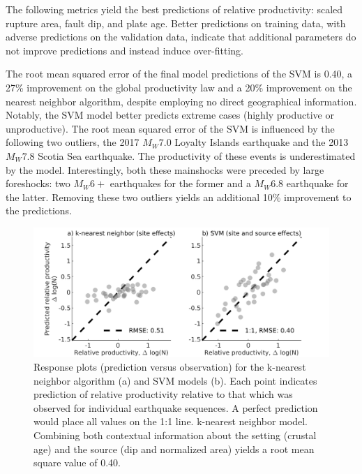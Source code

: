 \documentclass[draft, jgrga]{agujournal2018}
\begin{document}
    The following metrics yield the best predictions of relative productivity: scaled rupture area, fault dip, and plate age. Better predictions on training data, with adverse predictions on the validation data, indicate that additional parameters do not improve predictions and instead induce over-fitting.
    
    The root mean squared error of the final model predictions of the SVM is 0.40, a 27\% improvement on the global productivity law and a 20\% improvement on the nearest neighbor algorithm, despite employing no direct geographical information. Notably, the SVM model better predicts extreme cases (highly productive or unproductive). The root mean squared error of the SVM is influenced by the following two outliers, the 2017 $M_W7.0$ Loyalty Islands earthquake and the 2013 $M_W7.8$ Scotia Sea earthquake. The productivity of these events is underestimated by the model. Interestingly, both these mainshocks were preceded by large foreshocks: two $M_W6+$ earthquakes for the former and a $M_W6.8$ earthquake for the latter. Removing these two outliers yields an additional 10\% improvement to the predictions.
    
    \begin{figure}
        \centering
        \includegraphics{figures/response.png}
        \caption{Response plots (prediction versus observation) for the k-nearest neighbor algorithm (a) and SVM models (b). Each point indicates prediction of relative productivity relative to that which was observed for individual earthquake sequences. A perfect prediction would place all values on the 1:1 line.  k-nearest neighbor model. Combining both contextual information about the setting (crustal age) and the source (dip and normalized area) yields a root mean square value of 0.40.}
        \label{fig:response}
    \end{figure}
    
\end{document}
